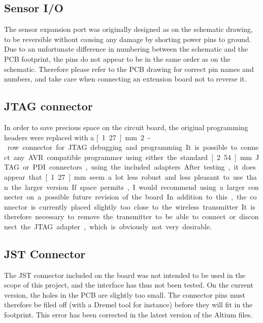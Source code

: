 \subsection{Sensor I/O}
The sensor expansion port was originally designed as on the schematic drawing,
to be reversible without causing any damage by shorting power pins to ground.
Due to an unfortunate difference in numbering between the schematic and the PCB
footprint, the pins do not appear to be in the same order as on the schematic.
Therefore please refer to the PCB drawing for correct pin names and numbers, and
take care when connecting an extension board not to reverse it.

\subsection{JTAG connector}
In order to save precious space on the circuit board, the original programming
headers were replaced with a \unit[1.27]{mm} 2-row connector for JTAG debugging
and programming. It is possible to connect any AVR compatible programmer using
either the standard \unit[2.54]{mm} JTAG or PDI connectors, using the included
adapters.

After testing, it does appear that \unit[1.27]{mm} seem a lot less robust and
less pleasant to use than the larger version. If space permits, I would
recommend using a larger connecter on a possible future revision of the board.

In addition to this, the connector is currently placed slightly too close to the
wireless transmitter. It is therefore necessary to remove the transmitter to be
able to connect or disconnect the JTAG adapter, which is obviously not very
desirable.

\subsection{JST Connector}
The JST connector included on the board was not intended to be used in the scope
of this project, and the interface has thus not been tested. On the current
version, the holes in the PCB are slightly too small. The connector pins must
therefore be filed off (with a Dremel tool for instance) before they will fit in
the footprint. This error has been corrected in the latest version of the Altium
files. %

